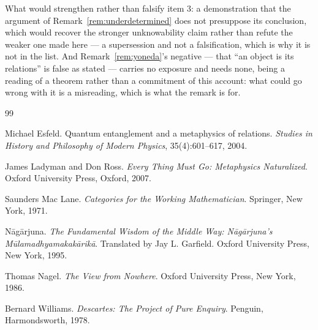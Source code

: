 \documentclass[11pt,a4paper]{article}
\theoremstyle{remark}\newtheorem{remark}[definition]{Remark}
\begin{document}
What would strengthen rather than falsify item 3: a demonstration that the argument of
Remark~\ref{rem:underdetermined} does not presuppose its conclusion, which would recover the stronger
unknowability claim rather than refute the weaker one made here --- a supersession and not a
falsification, which is why it is not in the list. And Remark~\ref{rem:yoneda}'s negative --- that
``an object is its relations'' is false as stated --- carries no exposure and needs none, being a
reading of a theorem rather than a commitment of this account: what could go wrong with it is a
misreading, which is what the remark is for.

\begin{thebibliography}{99}

Michael Esfeld.
\newblock Quantum entanglement and a metaphysics of relations.
\newblock \emph{Studies in History and Philosophy of Modern Physics}, 35(4):601--617, 2004.

James Ladyman and Don Ross.
\newblock \emph{Every Thing Must Go: Metaphysics Naturalized}.
\newblock Oxford University Press, Oxford, 2007.

Saunders Mac Lane.
\newblock \emph{Categories for the Working Mathematician}.
\newblock Springer, New York, 1971.

N\=ag\=arjuna.
\newblock \emph{The Fundamental Wisdom of the Middle Way: N\=ag\=arjuna's M\=ulamadhyamakak\=arik\=a}.
\newblock Translated by Jay L. Garfield. Oxford University Press, New York, 1995.

Thomas Nagel.
\newblock \emph{The View from Nowhere}.
\newblock Oxford University Press, New York, 1986.

Bernard Williams.
\newblock \emph{Descartes: The Project of Pure Enquiry}.
\newblock Penguin, Harmondsworth, 1978.

\end{thebibliography}
\end{document}

